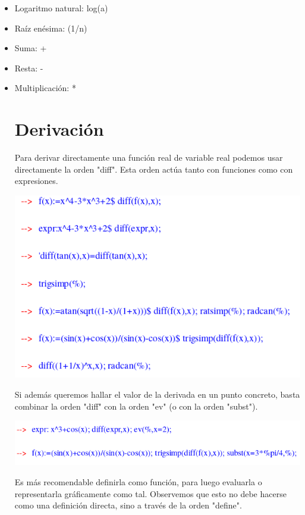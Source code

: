 \documentclass{article}
\begin{document}
\begin{itemize}
\item Logaritmo natural: log(a)
\item Raíz enésima: (1/n)
\item Suma: +
\item Resta: -
\item Multiplicación: *


\section*{Derivación}
Para derivar directamente una función real de variable real podemos usar directamente la orden "diff". Esta orden actúa tanto con funciones como con expresiones.\\

\begin{center}
\includegraphics[scale=0.5]{Act92.png}
\end{center}

Si además queremos hallar el valor de la derivada en un punto concreto, basta combinar la orden "diff" con la orden "ev" (o con la orden "subst").

\begin{center}
\includegraphics[scale=0.5]{Act93.png}
\end{center}

Es más recomendable definirla como función, para luego
evaluarla o representarla gráficamente como tal. Observemos que esto no debe hacerse como una definición directa, sino a través de la orden "define".


\end{itemize}
\end{document}
